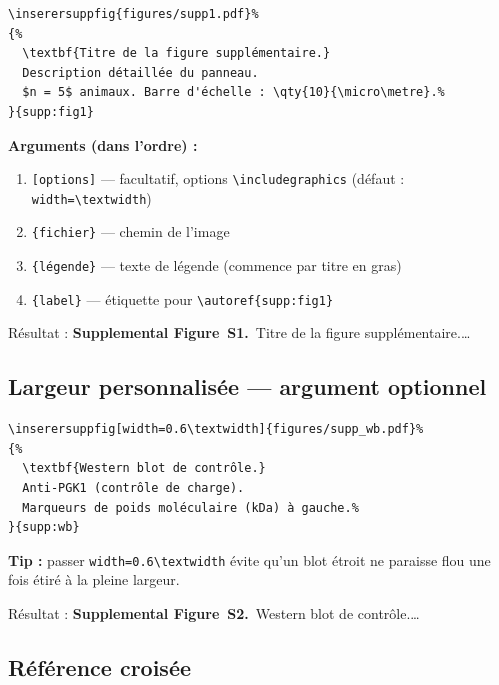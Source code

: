\documentclass[12pt, a4paper]{article}
\begin{document}
\begin{demo}
\begin{lstlisting}[style=latexcode]
% Après \biblio — pleine largeur, numérotation S1, S2...
\inserersuppfig{figures/supp1.pdf}%
{%
  \textbf{Titre de la figure supplémentaire.}
  Description détaillée du panneau.
  $n = 5$ animaux. Barre d'échelle : \qty{10}{\micro\metre}.%
}{supp:fig1}
\end{lstlisting}
\tcblower
{\footnotesize\textbf{Arguments (dans l'ordre) :}
\begin{enumerate}[noitemsep, topsep=2pt]
  \item \texttt{[options]} — facultatif, options \verb|\includegraphics| (défaut : \texttt{width=\textbackslash textwidth})
  \item \texttt{\{fichier\}} — chemin de l'image
  \item \texttt{\{légende\}} — texte de légende (commence par titre en gras)
  \item \texttt{\{label\}} — étiquette pour \verb|\autoref{supp:fig1}|
\end{enumerate}
\medskip
Résultat : \textbf{Supplemental Figure~S1.}~Titre de la figure supplémentaire.\ldots}
\end{demo}

\subsection{Largeur personnalisée — argument optionnel}

\begin{demo}
\begin{lstlisting}[style=latexcode]
% Western blot : centré, largeur réduite à 60 %
\inserersuppfig[width=0.6\textwidth]{figures/supp_wb.pdf}%
{%
  \textbf{Western blot de contrôle.}
  Anti-PGK1 (contrôle de charge).
  Marqueurs de poids moléculaire (kDa) à gauche.%
}{supp:wb}
\end{lstlisting}
\tcblower
{\footnotesize\textbf{Tip :} passer \texttt{width=0.6\textbackslash textwidth} évite qu'un blot étroit ne paraisse flou une fois étiré à la pleine largeur.\medskip

Résultat : \textbf{Supplemental Figure~S2.}~Western blot de contrôle.\ldots}
\end{demo}

\subsection{Référence croisée}
\end{document}
